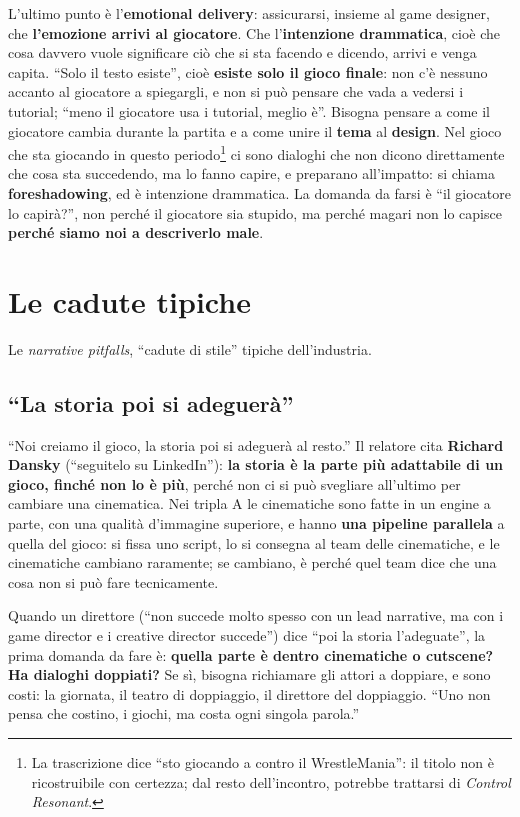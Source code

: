 L'ultimo punto è l'\textbf{emotional delivery}: assicurarsi, insieme al game
designer, che \textbf{l'emozione arrivi al giocatore}. Che l'\textbf{intenzione
drammatica}, cioè che cosa davvero vuole significare ciò che si sta facendo e
dicendo, arrivi e venga capita. ``Solo il testo esiste'', cioè \textbf{esiste
solo il gioco finale}: non c'è nessuno accanto al giocatore a spiegargli, e
non si può pensare che vada a vedersi i tutorial; ``meno il giocatore usa i
tutorial, meglio è''. Bisogna pensare a come il giocatore cambia durante la
partita e a come unire il \textbf{tema} al \textbf{design}. Nel gioco che sta
giocando in questo periodo\footnote{La trascrizione dice ``sto giocando a
contro il WrestleMania'': il titolo non è ricostruibile con certezza;
dal resto dell'incontro, potrebbe trattarsi di \emph{Control Resonant}.}
ci sono dialoghi che non dicono direttamente che cosa sta succedendo, ma lo
fanno capire, e preparano all'impatto: si chiama \textbf{foreshadowing}, ed è
intenzione drammatica. La domanda da farsi è ``il giocatore lo capirà?'', non
perché il giocatore sia stupido, ma perché magari non lo capisce \textbf{perché
siamo noi a descriverlo male}.

\section{Le cadute tipiche}
\label{p3:sec:pitfalls}

Le \emph{narrative pitfalls}, ``cadute di stile'' tipiche dell'industria.

\subsection{``La storia poi si adeguerà''}

``Noi creiamo il gioco, la storia poi si adeguerà al resto.'' Il relatore cita
\textbf{Richard Dansky} (``seguitelo su LinkedIn''): \textbf{la storia è la
parte più adattabile di un gioco, finché non lo è più}, perché non ci si può
svegliare all'ultimo per cambiare una cinematica. Nei tripla A le cinematiche
sono fatte in un engine a parte, con una qualità d'immagine superiore, e hanno
\textbf{una pipeline parallela} a quella del gioco: si fissa uno script, lo si
consegna al team delle cinematiche, e le cinematiche cambiano raramente; se
cambiano, è perché quel team dice che una cosa non si può fare tecnicamente.

Quando un direttore (``non succede molto spesso con un lead narrative, ma
con i game director e i creative director succede'') dice ``poi la storia
l'adeguate'', la prima domanda da fare è: \textbf{quella parte è dentro
cinematiche o cutscene? Ha dialoghi doppiati?} Se sì, bisogna richiamare gli
attori a doppiare, e sono costi: la giornata, il teatro di doppiaggio, il
direttore del doppiaggio. ``Uno non pensa che costino, i giochi, ma costa ogni
singola parola.''

